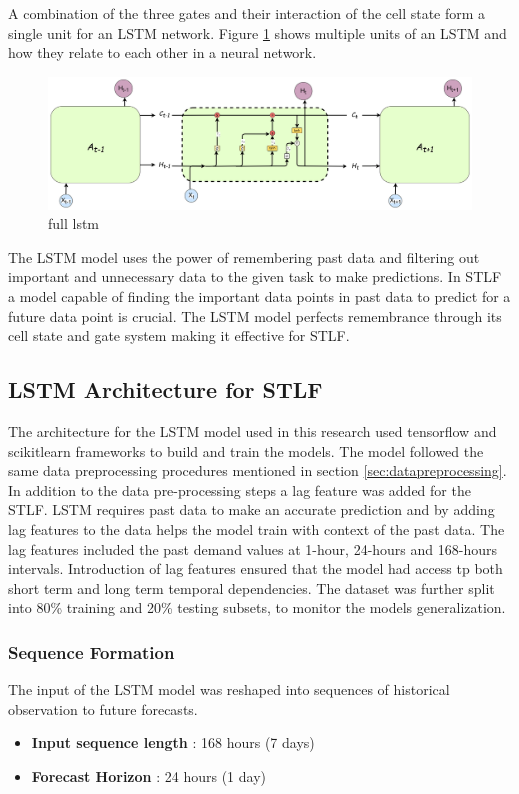   A combination of the three gates and their interaction of the cell state form a single unit for an LSTM network. Figure \ref{fig:full-lstm} shows multiple units of an LSTM and how they relate to each other in a neural network. 
 \begin{figure}[h]
 	\centering
 	\includegraphics[width=0.9\linewidth]{"Chapters/images/full lstm"}
 	\caption{full lstm}
 	\label{fig:full-lstm}
 \end{figure}
 The LSTM model uses the power of remembering past data and filtering out important and unnecessary data to the given task to make predictions. In STLF a model capable of finding the important data points in past data to predict for a future data point is crucial. The LSTM model perfects remembrance through its cell state and gate system making it effective for STLF.
 
 \subsection{LSTM Architecture for STLF}
 
 The architecture for the LSTM model used in this research used tensorflow and scikitlearn frameworks to build and train the models. The model followed the same data preprocessing procedures mentioned in section \ref{sec:datapreprocessing}. In addition to the data pre-processing steps a lag feature was added for the STLF. LSTM requires past data to make an accurate prediction and by adding lag features to the data helps the model train with context of the past data. The lag features included the past demand values at 1-hour, 24-hours and 168-hours intervals. Introduction of lag features ensured that the model had access tp both short term and long term temporal dependencies. The dataset was further split into 80\% training and 20\% testing subsets, to monitor the models generalization.
 
 \subsubsection{Sequence Formation}
 The input of the LSTM model was reshaped into sequences of historical observation to future forecasts.
 \begin{itemize}
 	\item \textbf{Input sequence length} : 168 hours (7 days)
 	\item \textbf{Forecast Horizon} : 24 hours (1 day)
 \end{itemize}
 
